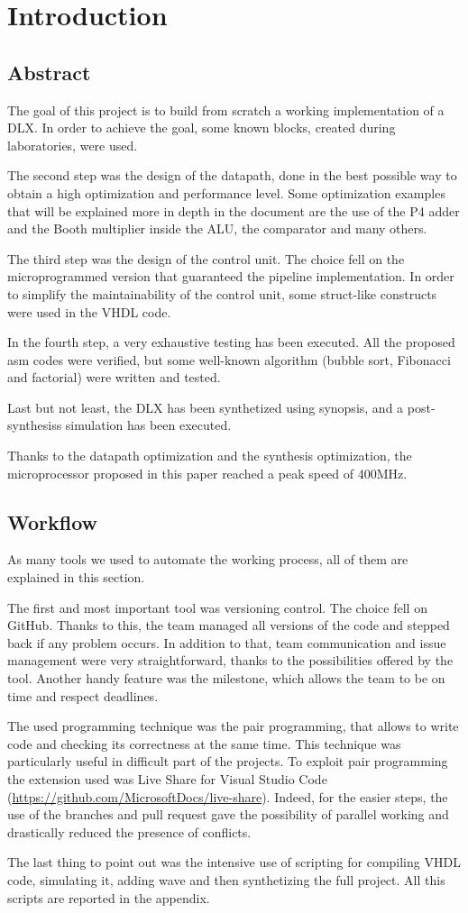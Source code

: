 \chapter{Introduction}

\section{Abstract}
The goal of this project is to build from scratch a working implementation of a DLX. In order to achieve the goal, some known blocks, created during laboratories, were used. 

The second step was the design of the datapath, done in the best possible way to obtain a high optimization and performance level. Some optimization examples that will be explained more in depth in the document are the use of the P4 adder and the Booth multiplier inside the ALU, the comparator and many others. 

The third step was the design of the control unit. The choice fell on the microprogrammed version that guaranteed the pipeline implementation. In order to simplify the maintainability of the control unit, some struct-like constructs were used in the VHDL code. 

In the fourth step, a very exhaustive testing has been executed. All the proposed asm codes were verified, but some well-known algorithm (bubble sort, Fibonacci and factorial) were written and tested.

Last but not least, the DLX has been synthetized using synopsis, and a post-synthesiss simulation has been executed. 

Thanks to the datapath optimization and the synthesis optimization, the microprocessor proposed in this paper reached a peak speed of 400MHz.  
\section{Workflow}
As many tools we used to automate the working process, all of them are explained in this section.

The first and most important tool was versioning control. The choice fell on GitHub. Thanks to this, the team managed all versions of the code and stepped back if any problem occurs. In addition to that, team communication and issue management were very straightforward, thanks to the possibilities offered by the tool. Another handy feature was the milestone, which allows the team to be on time and respect deadlines. 

The used programming technique was the pair programming, that allows to write code and checking its correctness at the same time. This technique was particularly useful in difficult part of the projects. To exploit pair programming the extension used was Live Share for Visual Studio Code (\url{https://github.com/MicrosoftDocs/live-share}). Indeed, for the easier steps, the use of the branches and pull request gave the possibility of parallel working and drastically reduced the presence of conflicts. 

The last thing to point out was the intensive use of scripting for compiling VHDL code, simulating it, adding wave and then synthetizing the full project. All this scripts are reported in the appendix.